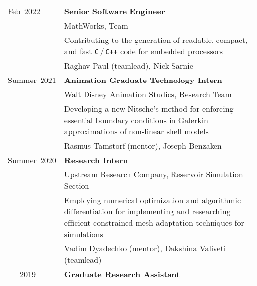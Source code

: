\documentclass[a4paper,12pt]{article}
\makeatletter
\newcommand{\myuline}[1]{%
	\uline{\phantom{#1}}%
	\llap{\contour{bgclr}{#1}}%
}\small
\newcommand\xhref[2]{\href{#1}{\myuline{#2}}}
\newcommand\myrefs{\multicolumn{1}{r}{\color{minorclr}References:}}
\newcommand\at{\multicolumn{1}{r}{\color{minorclr}@}}
\makeatother
\begin{document}
	\begin{longtable}{>{\raggedright\arraybackslash}p{2.5cm}>{\raggedright\arraybackslash}p{14.6cm}}
		Feb~2022~--
			& \textbf{Senior Software Engineer}\vspace{2mm}\\
			\at & MathWorks, \xhref{https://www.mathworks.com/products/embedded-coder.html}{Embedded Coder} Team\vspace{2mm}\\
			& Contributing to the generation of readable, compact, and fast \texttt{C}\,/\,\texttt{C++} code for embedded processors\vspace{2mm}\\
			\myrefs & Raghav Paul (teamlead), Nick Sarnie\vspace{4mm}\\
		Summer~2021
			& \textbf{Animation Graduate Technology Intern}\vspace{2mm}\\
			\at & Walt Disney Animation Studios, \xhref{https://www.disneyanimation.com/technology/}{WDAS Technology} Research Team\vspace{2mm}\\
			& Developing a new Nitsche's method for enforcing essential boundary conditions in Galerkin approximations of non-linear shell models\vspace{2mm}\\
			\myrefs & Rasmus Tamstorf (mentor), Joseph Benzaken\vspace{4mm}\\
		Summer~2020
			& \textbf{Research Intern}\vspace{2mm}\\
			\at & \xhref{https://corporate.exxonmobil.com/}{ExxonMobil} Upstream Research Company, Reservoir Simulation Section\vspace{2mm}\\
			& Employing numerical optimization and algorithmic differentiation for implementing and researching efficient constrained mesh adaptation techniques for \xhref{https://en.wikipedia.org/wiki/Hydraulic_fracturing}{hydrofrac} simulations\vspace{2mm}\\
			\myrefs & Vadim Dyadechko (mentor), Dakshina Valiveti (teamlead) \vspace{4mm}\\			
		2018~--~2019
			& \textbf{Graduate Research Assistant}\vspace{2mm}\\

\end{longtable}
\end{document}
